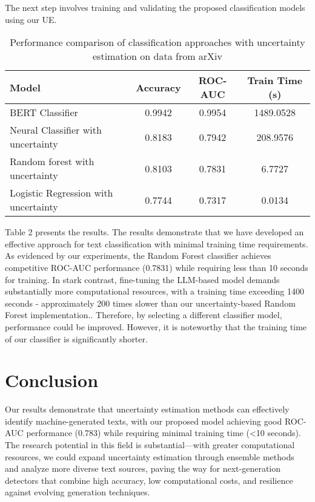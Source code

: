 \documentclass[a4paper, 12pt]{article}
\begin{document}
The next step involves training and validating the proposed classification models using our UE.

\begin{table}[ht]
\centering
\begin{tabular}{|l|c|c|c|}
\hline
\textbf{Model} & \textbf{Accuracy} & \textbf{ROC-AUC} & \textbf{Train Time (s)} \\
\hline
BERT Classifier & 0.9942 & 0.9954 & 1489.0528 \\
Neural Classifier with uncertainty & 0.8183 & 0.7942 & 208.9576 \\
Random forest with uncertainty & 0.8103 & 0.7831 & 6.7727 \\
Logistic Regression with uncertainty & 0.7744 & 0.7317 & 0.0134 \\
\hline
\end{tabular}
\caption{Performance comparison of classification approaches with uncertainty estimation on data from arXiv}
\label{tab:model-performance}
\end{table}

Table 2 presents the results. The results demonstrate that we have developed an effective approach for text classification with minimal training time requirements. As evidenced by our experiments, the Random Forest classifier achieves competitive ROC-AUC performance (0.7831) while requiring less than 10 seconds for training. In stark contrast, fine-tuning the LLM-based model demands substantially more computational resources, with a training time exceeding 1400 seconds - approximately 200 times slower than our uncertainty-based Random Forest implementation.. Therefore, by selecting a different classifier model, performance could be improved. However, it is noteworthy that the training time of our classifier is significantly shorter.

\section{Conclusion}

Our results demonstrate that uncertainty estimation methods can effectively identify machine-generated texts, with our proposed model achieving good ROC-AUC performance (0.783) while requiring minimal training time (<10 seconds). The research potential in this field is substantial—with greater computational resources, we could expand uncertainty estimation through ensemble methods and analyze more diverse text sources, paving the way for next-generation detectors that combine high accuracy, low computational costs, and resilience against evolving generation techniques.



\end{document}
